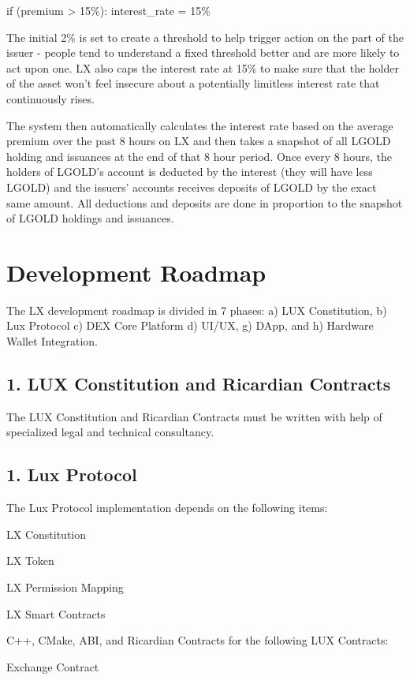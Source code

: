 \documentclass[11pt]{article}
\begin{document}
if (premium > 15\%): interest\_rate = 15\%


The initial 2\% is set to create a threshold to help trigger action on the part of the issuer - people tend to understand a fixed threshold better and are more likely to act upon one. LX also caps the interest rate at 15\% to make sure that the holder of the asset won't feel insecure about a potentially limitless interest rate that continuously rises.


The system then automatically calculates the interest rate based on the average premium over the past 8 hours on LX and then takes a snapshot of all LGOLD holding and issuances at the end of that 8 hour period. Once every 8 hours, the holders of LGOLD's account is deducted by the interest (they will have less LGOLD) and the issuers' accounts receives deposits of LGOLD by the exact same amount. All deductions and deposits are done in proportion to the snapshot of LGOLD holdings and issuances.


\section{Development Roadmap}

The LX development roadmap is divided in 7 phases: a) LUX Constitution, b) Lux Protocol c) DEX Core Platform d) UI/UX, g) DApp, and h) Hardware Wallet Integration.


\subsection{1. LUX Constitution and Ricardian Contracts}

The LUX Constitution and Ricardian Contracts must be written with help of specialized legal and technical consultancy.


\subsection{1. Lux Protocol}

The Lux Protocol implementation depends on the following items:


LX Constitution


LX Token


LX Permission Mapping


LX Smart Contracts


C++, CMake, ABI, and Ricardian Contracts for the following LUX Contracts:


Exchange Contract
\end{document}
